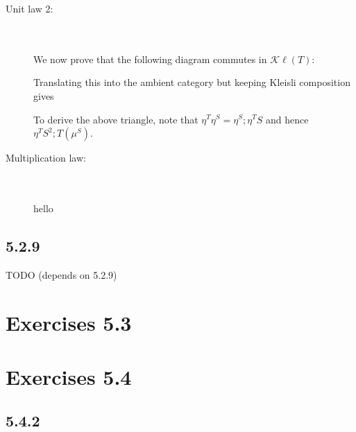 \documentclass{article}
\begin{document}
\begin{description}
\item[Unit law 2:]~\\~\\

We now prove that the following diagram commutes in $\mathcal K \ell(T)$:
\begin{center}
\end{center}

Translating this into the ambient category but keeping Kleisli composition gives

\begin{center}
\end{center}

To derive the above triangle, note that $\eta^T \eta^S = \eta^S;\eta^T S$ and hence $\eta^T S^2; T(\mu^S)$.

\item[Multiplication law:]~\\~\\
hello

\end{description}

\subsection*{5.2.9}

TODO (depends on 5.2.9)

\section*{Exercises 5.3}



\section*{Exercises 5.4}

\subsection*{5.4.2}
 
\end{document}
